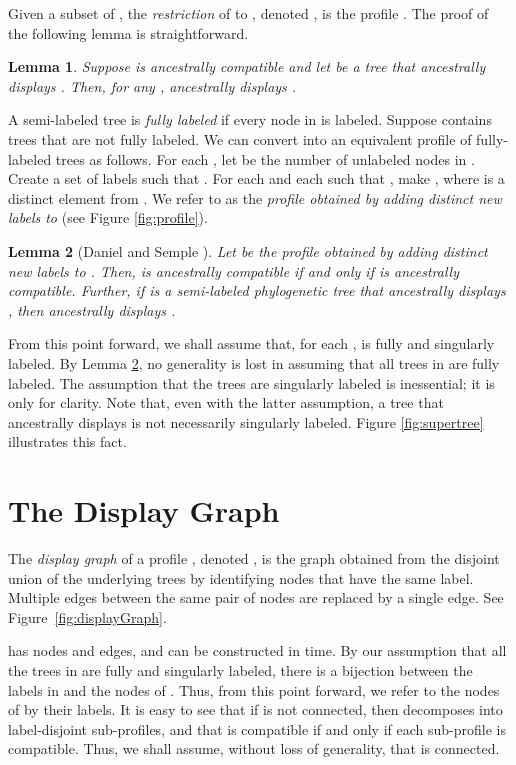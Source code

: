 \documentclass[11pt]{article}
\newtheorem{lemma}{Lemma}
\theoremstyle{definition}
\begin{document}
Given a subset  of , the \emph{restriction} of  to , denoted , is the profile .  The proof of the following lemma is straightforward.

\begin{lemma}\label{lm:compatSubprofile}
Suppose  is ancestrally compatible and let  be a tree that ancestrally displays .  Then, for any ,  ancestrally displays .
\end{lemma}

A  semi-labeled tree  is \emph{fully labeled} if every node in  is labeled.  Suppose  contains trees that are not fully labeled.  We can convert  into an equivalent profile  of fully-labeled trees as follows.  For each , let  be the number of unlabeled nodes in .  Create a set  of  labels such that .  For each  and each  such that , make , where  is a distinct element from .
We refer to  as the \emph{profile obtained by adding distinct new labels to } (see Figure \ref{fig:profile}).


\begin{lemma}[Daniel and Semple \cite{DanielSemple2004}]\label{lm:fullyL}
Let  be the profile obtained by adding distinct new labels to . Then,  is ancestrally compatible if and only if  is ancestrally compatible. Further, if  is a semi-labeled phylogenetic tree that ancestrally displays , then  ancestrally displays .
\end{lemma}

From this point forward, we shall assume that,
for each ,  is fully and singularly labeled.
By Lemma \ref{lm:fullyL}, no generality is lost in assuming that all trees in  are fully labeled. 
The assumption that the trees are singularly labeled is inessential; it is only for clarity.  Note that, even with the latter assumption, a tree that ancestrally displays  is not necessarily singularly labeled.  Figure \ref{fig:supertree} illustrates this fact.

\section{The Display Graph}\label{sec:dispGraph}

The \emph{display graph} of a profile , denoted , is the graph obtained from the disjoint union of the underlying trees  by identifying nodes that have the same label. Multiple edges between the same pair of nodes are replaced by a single edge. See Figure~\ref{fig:displayGraph}. 


 has  nodes and edges, and can be constructed in  time.  By our assumption that all the trees in  are fully and singularly labeled,
there is a bijection between the labels in  and the nodes of .  Thus, from this point forward, we refer to the nodes of  by their labels.
It is easy to see that if  is not connected, then  decomposes into label-disjoint sub-profiles, and that  is compatible if and only if each sub-profile is compatible.  Thus, we shall assume, without loss of generality, that  is connected. 
\end{document}
